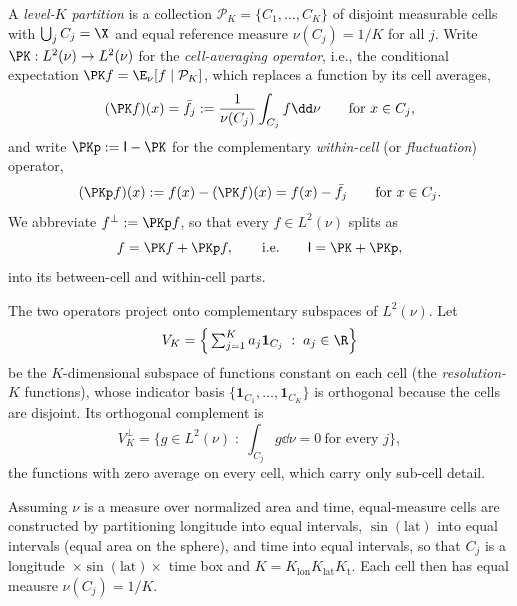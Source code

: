 \begin{definition}
\label{def:partition}
A \emph{level-$K$ partition} is a collection
$\mathcal{P}_K=\{C_1,\dots,C_K\}$ of disjoint measurable cells with
$\bigcup_j C_j=\X$ and equal reference measure $\nu(C_j)=1/K$ for all
$j$. Write $\PK:L^2(\nu)\to L^2(\nu)$ for the \emph{cell-averaging
operator}, i.e., the conditional expectation
$\PK f=\E_\nu[f\mid\mathcal{P}_K]$, which replaces a function by its cell
averages,
\[
  (\PK f)(x)=\bar f_j:=\frac{1}{\nu(C_j)}\int_{C_j} f\dd\nu
  \qquad\text{for }x\in C_j ,
\]
and write $\PKp:=\mathsf{I}-\PK$ for the complementary
\emph{within-cell} (or \emph{fluctuation}) operator,
\[
  (\PKp f)(x) := f(x)-(\PK f)(x) = f(x)-\bar f_j
  \qquad\text{for }x\in C_j .
\]
We abbreviate $f^{\perp}:=\PKp f$, so that every $f\in L^2(\nu)$ splits
as
\begin{equation}
  f=\PK f+\PKp f,\qquad\text{i.e.}\qquad \mathsf{I}=\PK+\PKp ,
  \label{eq:split}
\end{equation}
into its between-cell and within-cell parts.
\end{definition}

The two operators project onto complementary subspaces of $L^2(\nu)$.
Let
\[
  V_K=\Big\{\textstyle\sum_{j=1}^{K}a_j\mathbf{1}_{C_j}\;:\;a_j\in\R\Big\}
\]
be the $K$-dimensional subspace of functions constant on each cell (the
\emph{resolution-$K$} functions), whose indicator basis
$\{\mathbf{1}_{C_1},\dots,\mathbf{1}_{C_K}\}$ is orthogonal because the
cells are disjoint. Its orthogonal complement is
\[
  V_K^{\perp}=\Big\{g\in L^2(\nu)\;:\;\int_{C_j}g\dd\nu=0
    \ \text{for every }j\Big\},
\]
the functions with zero average on every cell, which carry only sub-cell
detail.

\begin{remark}
\label{rem:buildK}
Assuming $\nu$ is a measure over normalized area and time, equal-measure
cells are constructed by partitioning  
longitude into equal intervals, $\sin(\mathrm{lat})$ into equal
intervals (equal area on the sphere), and time into equal intervals,
so that $C_j$ is a longitude~$\times\sin(\mathrm{lat})\times$ time box
and $K=K_{\mathrm{lon}}K_{\mathrm{lat}}K_{\mathrm{t}}$. Each cell then
has equal meausre $\nu(C_j)=1/K$.
\end{remark}

